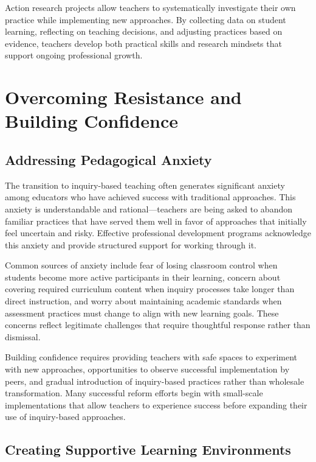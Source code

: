 \documentclass[
  Letterpaper,
]{scrbook}
\begin{document}
Action research projects allow teachers to systematically investigate
their own practice while implementing new approaches. By collecting data
on student learning, reflecting on teaching decisions, and adjusting
practices based on evidence, teachers develop both practical skills and
research mindsets that support ongoing professional growth.

\section{Overcoming Resistance and Building
Confidence}\label{overcoming-resistance-and-building-confidence}

\subsection{Addressing Pedagogical
Anxiety}\label{addressing-pedagogical-anxiety}

The transition to inquiry-based teaching often generates significant
anxiety among educators who have achieved success with traditional
approaches. This anxiety is understandable and rational---teachers are
being asked to abandon familiar practices that have served them well in
favor of approaches that initially feel uncertain and risky. Effective
professional development programs acknowledge this anxiety and provide
structured support for working through it.

Common sources of anxiety include fear of losing classroom control when
students become more active participants in their learning, concern
about covering required curriculum content when inquiry processes take
longer than direct instruction, and worry about maintaining academic
standards when assessment practices must change to align with new
learning goals. These concerns reflect legitimate challenges that
require thoughtful response rather than dismissal.

Building confidence requires providing teachers with safe spaces to
experiment with new approaches, opportunities to observe successful
implementation by peers, and gradual introduction of inquiry-based
practices rather than wholesale transformation. Many successful reform
efforts begin with small-scale implementations that allow teachers to
experience success before expanding their use of inquiry-based
approaches.

\subsection{Creating Supportive Learning
Environments}\label{creating-supportive-learning-environments}
\end{document}
